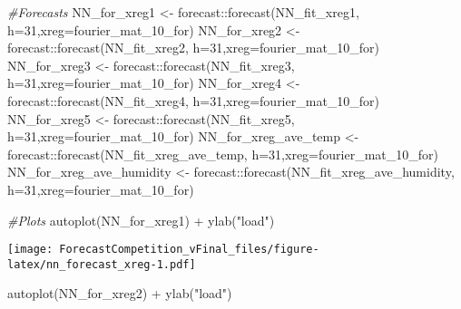 \documentclass[
]{article}
\newenvironment{Shaded}{\begin{snugshade}}{\end{snugshade}}
\newcommand{\AttributeTok}[1]{\textcolor[rgb]{0.77,0.63,0.00}{#1}}
\newcommand{\CommentTok}[1]{\textcolor[rgb]{0.56,0.35,0.01}{\textit{#1}}}
\newcommand{\DecValTok}[1]{\textcolor[rgb]{0.00,0.00,0.81}{#1}}
\newcommand{\FunctionTok}[1]{\textcolor[rgb]{0.00,0.00,0.00}{#1}}
\newcommand{\NormalTok}[1]{#1}
\newcommand{\OtherTok}[1]{\textcolor[rgb]{0.56,0.35,0.01}{#1}}
\newcommand{\SpecialCharTok}[1]{\textcolor[rgb]{0.00,0.00,0.00}{#1}}
\newcommand{\StringTok}[1]{\textcolor[rgb]{0.31,0.60,0.02}{#1}}
\begin{document}
\begin{Shaded}
\begin{Highlighting}[]
\CommentTok{\#Forecasts}
\NormalTok{NN\_for\_xreg1 }\OtherTok{\textless{}{-}}\NormalTok{ forecast}\SpecialCharTok{::}\FunctionTok{forecast}\NormalTok{(NN\_fit\_xreg1, }\AttributeTok{h=}\DecValTok{31}\NormalTok{,}\AttributeTok{xreg=}\NormalTok{fourier\_mat\_10\_for)}
\NormalTok{NN\_for\_xreg2 }\OtherTok{\textless{}{-}}\NormalTok{ forecast}\SpecialCharTok{::}\FunctionTok{forecast}\NormalTok{(NN\_fit\_xreg2, }\AttributeTok{h=}\DecValTok{31}\NormalTok{,}\AttributeTok{xreg=}\NormalTok{fourier\_mat\_10\_for)}
\NormalTok{NN\_for\_xreg3 }\OtherTok{\textless{}{-}}\NormalTok{ forecast}\SpecialCharTok{::}\FunctionTok{forecast}\NormalTok{(NN\_fit\_xreg3, }\AttributeTok{h=}\DecValTok{31}\NormalTok{,}\AttributeTok{xreg=}\NormalTok{fourier\_mat\_10\_for)}
\NormalTok{NN\_for\_xreg4 }\OtherTok{\textless{}{-}}\NormalTok{ forecast}\SpecialCharTok{::}\FunctionTok{forecast}\NormalTok{(NN\_fit\_xreg4, }\AttributeTok{h=}\DecValTok{31}\NormalTok{,}\AttributeTok{xreg=}\NormalTok{fourier\_mat\_10\_for)}
\NormalTok{NN\_for\_xreg5 }\OtherTok{\textless{}{-}}\NormalTok{ forecast}\SpecialCharTok{::}\FunctionTok{forecast}\NormalTok{(NN\_fit\_xreg5, }\AttributeTok{h=}\DecValTok{31}\NormalTok{,}\AttributeTok{xreg=}\NormalTok{fourier\_mat\_10\_for)}
\NormalTok{NN\_for\_xreg\_ave\_temp }\OtherTok{\textless{}{-}}\NormalTok{ forecast}\SpecialCharTok{::}\FunctionTok{forecast}\NormalTok{(NN\_fit\_xreg\_ave\_temp, }\AttributeTok{h=}\DecValTok{31}\NormalTok{,}\AttributeTok{xreg=}\NormalTok{fourier\_mat\_10\_for)}
\NormalTok{NN\_for\_xreg\_ave\_humidity }\OtherTok{\textless{}{-}}\NormalTok{ forecast}\SpecialCharTok{::}\FunctionTok{forecast}\NormalTok{(NN\_fit\_xreg\_ave\_humidity, }\AttributeTok{h=}\DecValTok{31}\NormalTok{,}\AttributeTok{xreg=}\NormalTok{fourier\_mat\_10\_for)}

\CommentTok{\#Plots}
\FunctionTok{autoplot}\NormalTok{(NN\_for\_xreg1) }\SpecialCharTok{+} \FunctionTok{ylab}\NormalTok{(}\StringTok{"load"}\NormalTok{) }
\end{Highlighting}
\end{Shaded}

\texttt{[image: ForecastCompetition\_vFinal\_files/figure-latex/nn\_forecast\_xreg-1.pdf]}

\begin{Shaded}
\begin{Highlighting}[]
\FunctionTok{autoplot}\NormalTok{(NN\_for\_xreg2) }\SpecialCharTok{+} \FunctionTok{ylab}\NormalTok{(}\StringTok{"load"}\NormalTok{) }
\end{Highlighting}
\end{Shaded}
\end{document}
